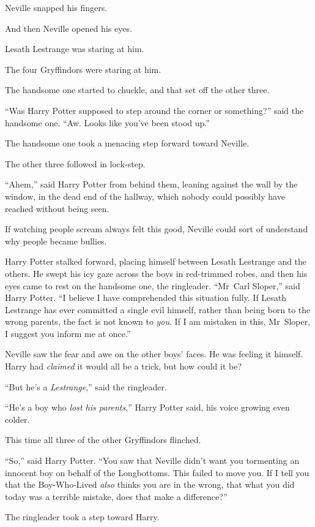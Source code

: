 Neville snapped his fingers.

And then Neville opened his eyes.

Lesath Lestrange was staring at him.

The four Gryffindors were staring at him.

The handsome one started to chuckle, and that set off the other three.

“Was Harry Potter supposed to step around the corner or something?” said the handsome one. “Aw. Looks like you’ve been stood up.”

The handsome one took a menacing step forward toward Neville.

The other three followed in lock-step.

“Ahem,” said Harry Potter from behind them, leaning against the wall by the window, in the dead end of the hallway, which nobody could possibly have reached without being seen.

If watching people scream always felt this good, Neville could sort of understand why people became bullies.

Harry Potter stalked forward, placing himself between Lesath Lestrange and the others. He swept his icy gaze across the boys in red-trimmed robes, and then his eyes came to rest on the handsome one, the ringleader. “Mr~Carl Sloper,” said Harry Potter. “I believe I have comprehended this situation fully. If Lesath Lestrange has ever committed a single evil himself, rather than being born to the wrong parents, the fact is not known to \emph{you}. If I am mistaken in this, Mr~Sloper, I suggest you inform me at once.”

Neville saw the fear and awe on the other boys’ faces. He was feeling it himself. Harry had \emph{claimed} it would all be a trick, but how could it be?

“But he’s a \emph{Lestrange},” said the ringleader.

“He’s a boy who \emph{lost his parents},” Harry Potter said, his voice growing even colder.

This time all three of the other Gryffindors flinched.

“So,” said Harry Potter. “You saw that Neville didn’t want you tormenting an innocent boy on behalf of the Longbottoms. This failed to move you. If I tell you that the Boy-Who-Lived \emph{also} thinks you are in the wrong, that what you did today was a terrible mistake, does that make a difference?”

The ringleader took a step toward Harry.

